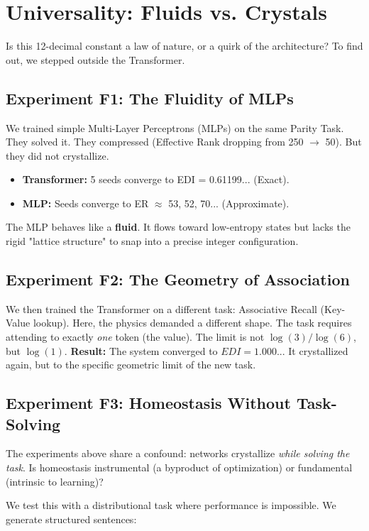 \section{Universality: Fluids vs. Crystals}\label{sec:universality}

Is this 12-decimal constant a law of nature, or a quirk of the architecture? To find out, we stepped outside the Transformer.

\subsection{Experiment F1: The Fluidity of MLPs}
We trained simple Multi-Layer Perceptrons (MLPs) on the same Parity Task. They solved it. They compressed (Effective Rank dropping from 250 $\to$ 50). But they did not crystallize.
\begin{itemize}
    \item \textbf{Transformer:} 5 seeds converge to EDI = 0.61199... (Exact).
    \item \textbf{MLP:} Seeds converge to ER $\approx$ 53, 52, 70... (Approximate).
\end{itemize}
The MLP behaves like a \textbf{fluid}. It flows toward low-entropy states but lacks the rigid "lattice structure" to snap into a precise integer configuration.

\subsection{Experiment F2: The Geometry of Association}
We then trained the Transformer on a different task: Associative Recall (Key-Value lookup).
Here, the physics demanded a different shape. The task requires attending to exactly \emph{one} token (the value). The limit is not $\log(3)/\log(6)$, but $\log(1)$.
\textbf{Result:} The system converged to $EDI = 1.000...$
It crystallized again, but to the specific geometric limit of the new task.

\subsection{Experiment F3: Homeostasis Without Task-Solving}

The experiments above share a confound: networks crystallize \emph{while solving the task}. Is homeostasis instrumental (a byproduct of optimization) or fundamental (intrinsic to learning)?

We test this with a distributional task where performance is impossible. We generate structured sentences:


